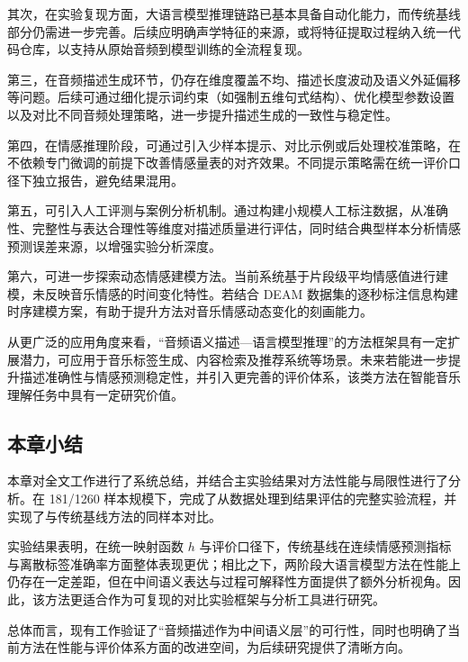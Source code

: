 其次，在实验复现方面，大语言模型推理链路已基本具备自动化能力，而传统基线部分仍需进一步完善。后续应明确声学特征的来源，或将特征提取过程纳入统一代码仓库，以支持从原始音频到模型训练的全流程复现。

第三，在音频描述生成环节，仍存在维度覆盖不均、描述长度波动及语义外延偏移等问题。后续可通过细化提示词约束（如强制五维句式结构）、优化模型参数设置以及对比不同音频处理策略，进一步提升描述生成的一致性与稳定性。

第四，在情感推理阶段，可通过引入少样本提示、对比示例或后处理校准策略，在不依赖专门微调的前提下改善情感量表的对齐效果。不同提示策略需在统一评价口径下独立报告，避免结果混用。

第五，可引入人工评测与案例分析机制。通过构建小规模人工标注数据，从准确性、完整性与表达合理性等维度对描述质量进行评估，同时结合典型样本分析情感预测误差来源，以增强实验分析深度。

第六，可进一步探索动态情感建模方法。当前系统基于片段级平均情感值进行建模，未反映音乐情感的时间变化特性。若结合 DEAM 数据集的逐秒标注信息构建时序建模方案，有助于提升方法对音乐情感动态变化的刻画能力。

从更广泛的应用角度来看，“音频语义描述—语言模型推理”的方法框架具有一定扩展潜力，可应用于音乐标签生成、内容检索及推荐系统等场景。未来若能进一步提升描述准确性与情感预测稳定性，并引入更完善的评价体系，该类方法在智能音乐理解任务中具有一定研究价值。

\subsection{本章小结}
本章对全文工作进行了系统总结，并结合主实验结果对方法性能与局限性进行了分析。在 181/1260 样本规模下，完成了从数据处理到结果评估的完整实验流程，并实现了与传统基线方法的同样本对比。

实验结果表明，在统一映射函数 $h$ 与评价口径下，传统基线在连续情感预测指标与离散标签准确率方面整体表现更优；相比之下，两阶段大语言模型方法在性能上仍存在一定差距，但在中间语义表达与过程可解释性方面提供了额外分析视角。因此，该方法更适合作为可复现的对比实验框架与分析工具进行研究。

总体而言，现有工作验证了“音频描述作为中间语义层”的可行性，同时也明确了当前方法在性能与评价体系方面的改进空间，为后续研究提供了清晰方向。
